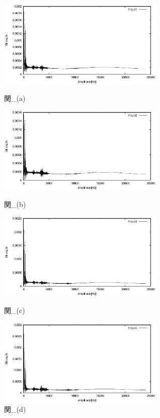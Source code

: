 \documentclass[titlepage]{jarticle}
\begin{document}
\begin{figure}[H]
  \begin{minipage}{0.495\hsize}
    \centering
    \includegraphics[width=8cm]{img/hisyo1.eps}
    \caption{関\_(a)}
    \label{hisyo1}
  \end{minipage}
  \begin{minipage}{0.495\hsize}
    \centering
    \includegraphics[width=8cm]{img/hisyo2.eps}
    \caption{関\_(b)}
    \label{hisyo2}
  \end{minipage}


  \begin{minipage}{0.495\hsize}
    \centering
    \includegraphics[width=8cm]{img/hisyo3.eps}
    \caption{関\_(c)}
    \label{hisyo3}
  \end{minipage}
  \begin{minipage}{0.495\hsize}
    \centering
    \includegraphics[width=8cm]{img/hisyo4.eps}
    \caption{関\_(d)}
    \label{hisyo4}
  \end{minipage}
\end{figure}
\end{document}
